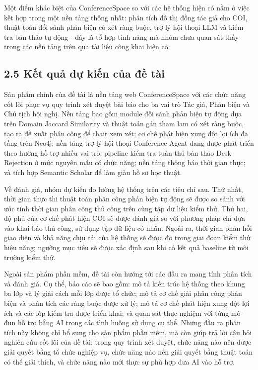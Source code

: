 Một điểm khác biệt của ConferenceSpace so với các hệ thống hiện có nằm ở việc kết hợp trong một nền tảng thống nhất: phân tích đồ thị đồng tác giả cho COI, thuật toán đối sánh phản biện có xét ràng buộc, trợ lý hội thoại LLM và kiểm tra bản thảo tự động - đây là tổ hợp tính năng mà nhóm chưa quan sát thấy trong các nền tảng trên qua tài liệu công khai hiện có.

\subsection*{2.5 Kết quả dự kiến của đề tài}

Sản phẩm chính của đề tài là nền tảng web ConferenceSpace với các chức năng cốt lõi phục vụ quy trình xét duyệt bài báo cho ba vai trò Tác giả, Phản biện và Chủ tịch hội nghị. Nền tảng bao gồm module đối sánh phản biện tự động dựa trên Domain Jaccard Similarity và thuật toán gán tham lam có xét ràng buộc, tạo ra đề xuất phân công để chair xem xét; cơ chế phát hiện xung đột lợi ích đa tầng trên Neo4j; nền tảng trợ lý hội thoại Conference Agent đang được phát triển theo hướng hỗ trợ nhiều vai trò; pipeline kiểm tra tuân thủ bản thảo Desk Rejection ở mức nguyên mẫu có chức năng; nền tảng thông báo thời gian thực; và tích hợp Semantic Scholar để làm giàu hồ sơ học thuật.

Về đánh giá, nhóm dự kiến đo lường hệ thống trên các tiêu chí sau. Thứ nhất, thời gian thực thi thuật toán phân công phản biện tự động sẽ được so sánh với ước tính thời gian phân công thủ công trên cùng tập dữ liệu kiểm thử. Thứ hai, độ phủ của cơ chế phát hiện COI sẽ được đánh giá so với phương pháp chỉ dựa vào khai báo thủ công, sử dụng tập dữ liệu có nhãn. Ngoài ra, thời gian phản hồi giao diện và khả năng chịu tải của hệ thống sẽ được đo trong giai đoạn kiểm thử hiệu năng; ngưỡng mục tiêu sẽ được xác định sau khi có kết quả baseline từ môi trường kiểm thử.

Ngoài sản phẩm phần mềm, đề tài còn hướng tới các đầu ra mang tính phân tích và đánh giá. Cụ thể, báo cáo sẽ bao gồm: mô tả kiến trúc hệ thống theo khung ba lớp và lý giải cách mỗi lớp được tổ chức; mô tả cơ chế giải phân công phản biện và phân tích các ràng buộc được xử lý; mô tả cơ chế phát hiện xung đột lợi ích và các lớp kiểm tra được triển khai; và quan sát thực nghiệm với từng mô-đun hỗ trợ bằng AI trong các tình huống sử dụng cụ thể. Những đầu ra phân tích này không chỉ bổ sung cho sản phẩm phần mềm, mà còn giúp trả lời câu hỏi nghiên cứu cốt lõi của đề tài: trong quy trình xét duyệt, chức năng nào nên được giải quyết bằng tổ chức nghiệp vụ, chức năng nào nên giải quyết bằng thuật toán có thể giải thích, và chức năng nào mới thực sự phù hợp đưa AI vào hỗ trợ.

